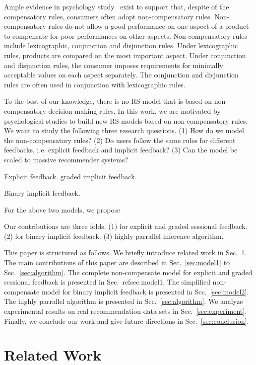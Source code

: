 \documentclass[conference]{IEEEtran}
\begin{document}
Ample evidence in psychology study~\cite{Engel1986Consumer} exist to support that, despite of the compensatory rules, consumers often adopt non-compensatory rules. Non-compensatory rules do not allow a good performance on one aspect of a product to compensate for poor performances on other aspects. Non-compensatory rules include lexicographic, conjunction and disjunction rules. Under lexicographic rules, products are compared on the most important aspect. Under conjunction and disjunction rules, the consumer imposes requirements for minimally acceptable values on each aspect separately. The conjunction and disjunction rules are often used in conjunction with lexicographic rules.

To the best of our knowledge, there is no RS model that is based on non-compensatory decision making rules.
In this work, we are motivated by psychological studies to build new RS models based on non-compensatory rules. We want to study the following three research questions. (1) How do we model the non-compensatory rules? (2) Do users follow the same rules for different feedbacks, i.e. explicit feedback and implicit feedback? (3) Can the model be scaled to massive recommender systems?
  
Explicit feedback. graded implicit feedback.  

Binary implicit feedback. 

For the above two models, we propose 

Our contributions are three folds. (1) for explicit and graded sessional feedback. (2) for binary implicit feedback. (3) highly parrallel inference algorithm. 

This paper is structured as follows. We briefly introduce related work in Sec.~\ref{sec:relatedwork}. The main contributions of this paper are described in Sec.~\ref{sec:model1} to Sec.~\ref{sec:algorithm}. The complete non-compensate model for explicit and graded sessional feedback is presented in Sec.~ref{sec:model1}. The simplified non-compensate model for binary implicit feedback is presented in Sec.~\ref{sec:model2}. The highly parrallel algorithm is presented in Sec.~\ref{sec:algorithm}. We analyze experimental results on real recommendation data sets in Sec.~\ref{sec:experiment}. Finally, we conclude our work and give future directions in Sec.~\ref{sec:conclusion}. 


\section{Related Work}\label{sec:relatedwork}
\end{document}
